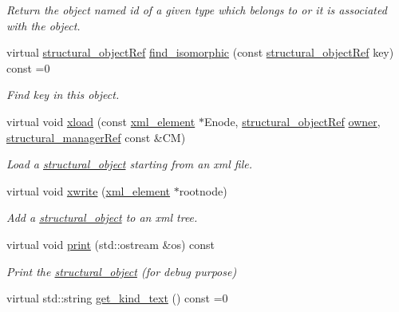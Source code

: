 \begin{DoxyCompactItemize}
\begin{DoxyCompactList}\small\item\em Return the object named id of a given type which belongs to or it is associated with the object. \end{DoxyCompactList}\item 
virtual \hyperlink{structural__objects_8hpp_a8ea5f8cc50ab8f4c31e2751074ff60b2}{structural\+\_\+object\+Ref} \hyperlink{classstructural__object_a87756f7dab3d9a866c81b96b88e11380}{find\+\_\+isomorphic} (const \hyperlink{structural__objects_8hpp_a8ea5f8cc50ab8f4c31e2751074ff60b2}{structural\+\_\+object\+Ref} key) const =0
\begin{DoxyCompactList}\small\item\em Find key in this object. \end{DoxyCompactList}\item 
virtual void \hyperlink{classstructural__object_a9a964af7fe7e95b34d03bb514756bb33}{xload} (const \hyperlink{classxml__element}{xml\+\_\+element} $\ast$Enode, \hyperlink{structural__objects_8hpp_a8ea5f8cc50ab8f4c31e2751074ff60b2}{structural\+\_\+object\+Ref} \hyperlink{classstructural__object_a3e96b3e00b8a78adfc44872d82e186ea}{owner}, \hyperlink{structural__manager_8hpp_ab3136f0e785d8535f8d252a7b53db5b5}{structural\+\_\+manager\+Ref} const \&CM)
\begin{DoxyCompactList}\small\item\em Load a \hyperlink{classstructural__object}{structural\+\_\+object} starting from an xml file. \end{DoxyCompactList}\item 
virtual void \hyperlink{classstructural__object_a7b0b509094451578b2dc10a9b716b16e}{xwrite} (\hyperlink{classxml__element}{xml\+\_\+element} $\ast$rootnode)
\begin{DoxyCompactList}\small\item\em Add a \hyperlink{classstructural__object}{structural\+\_\+object} to an xml tree. \end{DoxyCompactList}\item 
virtual void \hyperlink{classstructural__object_a6770e169cf00f814a35b2939ec8f92eb}{print} (std\+::ostream \&os) const
\begin{DoxyCompactList}\small\item\em Print the \hyperlink{classstructural__object}{structural\+\_\+object} (for debug purpose) \end{DoxyCompactList}\item 
virtual std\+::string \hyperlink{classstructural__object_a36c541b52425c4de8fa45d79285a97e7}{get\+\_\+kind\+\_\+text} () const =0

\end{DoxyCompactItemize}
